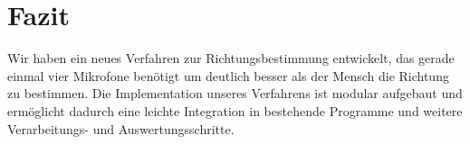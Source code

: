 \section{Fazit} 
Wir haben ein neues Verfahren zur Richtungsbestimmung entwickelt, das gerade einmal vier Mikrofone benötigt um deutlich besser als der Mensch die Richtung zu bestimmen. Die Implementation unseres Verfahrens ist modular aufgebaut und ermöglicht dadurch eine leichte Integration in bestehende Programme und weitere Verarbeitungs- und Auswertungsschritte.